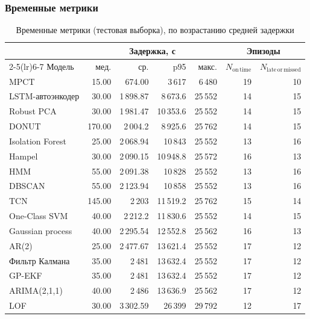 \documentclass[a4paper,12pt]{report}
\begin{document}
\subsubsection{Временные метрики}
\begin{table}[H]
\centering
\small
\caption{Временные метрики (тестовая выборка), по возрастанию средней задержки}
\begin{tabular}{lrrrrrr}
\toprule
 & \multicolumn{4}{c}{Задержка, с} & \multicolumn{2}{c}{Эпизоды} \\
\cmidrule(lr){2-5}\cmidrule(lr){6-7}
Модель & мед. & ср. & p95 & макс. & $N_{\mathrm{on\,time}}$ & $N_{\mathrm{late\,or\,missed}}$ \\
\midrule
MPCT & 15.00 & 674.00 & 3\,617 & 6\,480 & 19 & 10 \\
LSTM-автоэнкодер & 30.00 & 1\,898.87 & 8\,673.6 & 25\,552 & 14 & 15 \\
Robust PCA & 30.00 & 1\,981.47 & 10\,353.6 & 25\,552 & 14 & 15 \\
DONUT & 170.00 & 2\,004.2 & 8\,925.6 & 25\,762 & 14 & 15 \\
Isolation Forest & 25.00 & 2\,068.94 & 10\,843 & 25\,552 & 13 & 16 \\
Hampel & 30.00 & 2\,090.15 & 10\,948.8 & 25\,572 & 16 & 13 \\
HMM & 55.00 & 2\,091.38 & 10\,828 & 25\,552 & 13 & 16 \\
DBSCAN & 55.00 & 2\,123.94 & 10\,858 & 25\,552 & 13 & 16 \\
TCN & 145.00 & 2\,203 & 11\,519.2 & 25\,762 & 15 & 14 \\
One-Class SVM & 40.00 & 2\,212.2 & 11\,830.6 & 25\,552 & 14 & 15 \\
Gaussian process & 40.00 & 2\,295.54 & 12\,552.8 & 25\,562 & 16 & 13 \\
AR(2) & 25.00 & 2\,477.67 & 13\,621.4 & 25\,552 & 17 & 12 \\
Фильтр Калмана & 35.00 & 2\,481 & 13\,632.4 & 25\,552 & 17 & 12 \\
GP-EKF & 35.00 & 2\,481 & 13\,632.4 & 25\,552 & 17 & 12 \\
ARIMA(2,1,1) & 40.00 & 2\,486 & 13\,636.9 & 25\,562 & 17 & 12 \\
LOF & 30.00 & 3\,302.59 & 26\,399 & 29\,792 & 12 & 17 \\
\bottomrule
\end{tabular}
\end{table}
\end{document}
